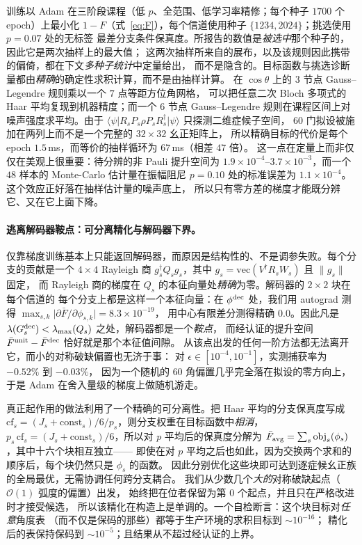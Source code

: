 \documentclass[11pt,a4paper]{article}
\newcommand{\ket}[1]{\lvert #1\rangle}
\newcommand{\bra}[1]{\langle #1\rvert}
\begin{document}
训练以 Adam 在三阶段课程（低 $p$、全范围、低学习率精修；每个种子 $1700$ 个 epoch）上最小化
$1-F$（式~\ref{eq:F}），每个信道使用种子 $\{1234,2024\}$；挑选使用 $p=0.07$ 处的无标签
最差分支条件保真度。所报告的数值是\emph{被选中}那个种子的，因此它是两次抽样上的最大值；
这两次抽样所来自的展布，以及该规则因此携带的偏倚，都在下文\emph{多种子统计}中定量给出，
而不是隐含的。目标函数与挑选诊断量都由\emph{精确}的确定性求积计算，而不是由抽样计算。
在 $\cos\theta$ 上的 $3$ 节点 Gauss--Legendre 规则乘以一个 $7$ 点等距方位角网格，
可以把任意二次 Bloch 多项式的 Haar 平均复现到机器精度；而一个 $6$ 节点 Gauss--Legendre
规则在课程区间上对噪声强度求平均。由于
$\bra{\psi}R_sP_s\rho P_sR_s^\dagger\ket{\psi}$ 只探测二维症候子空间，
$60$ 门拟设被施加在两列上而不是一个完整的 $32\times32$ 幺正矩阵上，
所以精确目标的代价是每个 epoch $1.5$\,ms，而等价的抽样循环为 $67$\,ms（相差 $47$ 倍）。
这一点在定量上而非仅仅在美观上很重要：待分辨的非 Pauli 提升空间为
$1.9\times10^{-4}$--$3.7\times10^{-3}$，而一个 $48$ 样本的 Monte-Carlo 估计量在振幅阻尼
$p=0.10$ 处的标准误差为 $1.1\times10^{-4}$。这个效应正好落在抽样估计量的噪声底上，
所以只有零方差的梯度才能既分辨它、又在它上面下降。

\paragraph{逃离解码器鞍点：可分离精化与解码器下界。}
仅靠梯度训练基本上只能返回解码器，而原因是结构性的、不是调参失败。每个分支的贡献是一个
$4\times4$ Rayleigh 商 $g_s^\dagger Q_s g_s$，其中
$g_s=\mathrm{vec}(V^\dagger R_sW_s)$ 且 $\lVert g_s\rVert$ 固定，
而 Rayleigh 商的梯度在 $Q_s$ 的本征向量处\emph{精确}为零。解码器的 $2\times2$ 块在每个信道的
每个分支上都是这样一个本征向量：在 $\phi^{\rm dec}$ 处，我们用 autograd 测得
$\max_{s,k}\lvert\partial\bar F/\partial\phi_{s,k}\rvert=8.3\times10^{-19}$，
用中心有限差分测得精确 $0.0$。因此凡是
$\lambda(G^{\rm dec}_s)<\lambda_{\max}(Q_s)$ 之处，解码器都是一个\emph{鞍点}，
而经认证的提升空间 $\bar F^{\rm unit}-\bar F^{\rm dec}$ 恰好就是那个本征值间隙。
从该点出发的任何一阶方法都无法离开它，而小的对称破缺偏置也无济于事：
对 $\epsilon\in[10^{-4},10^{-1}]$，实测捕获率为 $-0.52\%$ 到 $-0.03\%$，
因为一个随机的 $60$ 角偏置几乎完全落在拟设的零方向上，于是 Adam 在舍入量级的梯度上做随机游走。

真正起作用的做法利用了一个精确的可分离性。把 Haar 平均的分支保真度写成
$\mathrm{cf}_s=(J_s+\mathrm{const}_s)/6/p_s$，则分支权重在目标函数中\emph{相消}，
$p_s\,\mathrm{cf}_s=(J_s+\mathrm{const}_s)/6$，所以对 $p$ 平均后的保真度分解为
$\bar F_{\rm avg}=\sum_s \mathrm{obj}_s(\phi_s)$，其中十六个块相互独立——
即使在对 $p$ 平均之后也如此，因为交换两个求和的顺序后，每个块仍然只是 $\phi_s$ 的函数。
因此分别优化这些块即可达到逐症候幺正族的全局最优，无需协调任何跨分支耦合。
我们从少数几个\emph{大的}对称破缺起点（$\mathcal{O}(1)$ 弧度的偏置）出发，
始终把在位者保留为第 $0$ 个起点，并且只在严格改进时才接受候选，
所以该精化在构造上是单调的。一个自检断言：这个块目标对\emph{任意}角度表
（而不仅是保码的那些）都等于生产环境的求积目标到 $\sim10^{-16}$；
精化后的表保持保码到 $\sim10^{-5}$；且结果从不超过经认证的上界。
\end{document}
